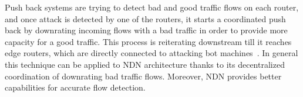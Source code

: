 Push back systems are trying to detect bad and good traffic flows on each router, and once attack is detected by one of the routers, it starts a coordinated push back by downrating incoming flows with a bad traffic in order to provide more capacity for a good traffic. This process is reiterating downstream till it reaches edge routers, which are directly connected to attacking bot machines~\cite{Pushback}. In general this technique can be applied to NDN architecture thanks to its decentralized coordination of downrating bad traffic flows. Moreover, NDN provides better capabilities for accurate flow detection.



